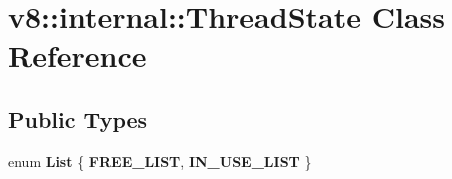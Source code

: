 \hypertarget{classv8_1_1internal_1_1_thread_state}{}\section{v8\+:\+:internal\+:\+:Thread\+State Class Reference}
\label{classv8_1_1internal_1_1_thread_state}
\subsection*{Public Types}
\begin{DoxyCompactItemize}
\item 
\hypertarget{classv8_1_1internal_1_1_thread_state_a395f566f2cfacad9de5f830d10867f8e}{}enum {\bfseries List} \{ {\bfseries F\+R\+E\+E\+\_\+\+L\+I\+S\+T}, 
{\bfseries I\+N\+\_\+\+U\+S\+E\+\_\+\+L\+I\+S\+T}
 \}\label{classv8_1_1internal_1_1_thread_state_a395f566f2cfacad9de5f830d10867f8e}

\end{DoxyCompactItemize}
